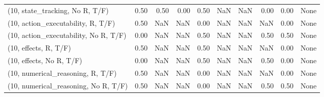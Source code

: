 \begin{table*}[h!]
\begin{adjustbox}{width=2\columnwidth,center}
\begin{tabular}{lrrr|rrr|rrr}
(10, state\_tracking, No R, T/F)       &                      0.50 &                  0.50 &                      0.00 &                          0.50 &                       NaN &                           NaN &                                   0.00 &                               0.00 &                                  None \\
(10, action\_executability, R, T/F)    &                      0.50 &                   NaN &                       NaN &                          0.00 &                       NaN &                           NaN &                                    NaN &                               0.00 &                                  None \\
(10, action\_executability, No R, T/F) &                      0.00 &                   NaN &                       NaN &                          0.50 &                       NaN &                           NaN &                                   0.50 &                               0.50 &                                  None \\
(10, effects, R, T/F)                 &                      0.50 &                   NaN &                       NaN &                          0.50 &                       NaN &                           NaN &                                    NaN &                               0.00 &                                  None \\
(10, effects, No R, T/F)              &                      0.00 &                   NaN &                       NaN &                          0.50 &                       NaN &                           NaN &                                   0.50 &                               0.00 &                                  None \\
(10, numerical\_reasoning, R, T/F)     &                      0.50 &                   NaN &                       NaN &                          0.00 &                       NaN &                           NaN &                                    NaN &                               0.00 &                                  None \\
(10, numerical\_reasoning, No R, T/F)  &                      0.50 &                   NaN &                       NaN &                          0.00 &                       NaN &                           NaN &                                   0.50 &                               0.50 &                                  None \\

\end{tabular}
\end{adjustbox}
\end{table*}
